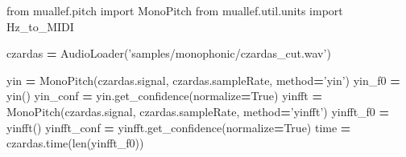 \documentclass[american,]{article}
\newenvironment{Shaded}{\begin{snugshade}}{\end{snugshade}}
\newcommand{\BuiltInTok}[1]{#1}
\newcommand{\ImportTok}[1]{#1}
\newcommand{\NormalTok}[1]{#1}
\newcommand{\OperatorTok}[1]{\textcolor[rgb]{0.81,0.36,0.00}{\textbf{#1}}}
\newcommand{\StringTok}[1]{\textcolor[rgb]{0.31,0.60,0.02}{#1}}
\newcommand{\VariableTok}[1]{\textcolor[rgb]{0.00,0.00,0.00}{#1}}
\begin{document}
\begin{Shaded}
\begin{Highlighting}[]
\ImportTok{from}\NormalTok{ muallef.pitch }\ImportTok{import}\NormalTok{ MonoPitch}
\ImportTok{from}\NormalTok{ muallef.util.units }\ImportTok{import}\NormalTok{ Hz_to_MIDI}

\NormalTok{czardas }\OperatorTok{=}\NormalTok{ AudioLoader(}\StringTok{'samples/monophonic/czardas_cut.wav'}\NormalTok{)}

\NormalTok{yin }\OperatorTok{=}\NormalTok{ MonoPitch(czardas.signal, czardas.sampleRate, method}\OperatorTok{=}\StringTok{'yin'}\NormalTok{)}
\NormalTok{yin_f0 }\OperatorTok{=}\NormalTok{ yin()}
\NormalTok{yin_conf }\OperatorTok{=}\NormalTok{ yin.get_confidence(normalize}\OperatorTok{=}\VariableTok{True}\NormalTok{)}
\NormalTok{yinfft }\OperatorTok{=}\NormalTok{ MonoPitch(czardas.signal, czardas.sampleRate, method}\OperatorTok{=}\StringTok{'yinfft'}\NormalTok{)}
\NormalTok{yinfft_f0 }\OperatorTok{=}\NormalTok{ yinfft()}
\NormalTok{yinfft_conf }\OperatorTok{=}\NormalTok{ yinfft.get_confidence(normalize}\OperatorTok{=}\VariableTok{True}\NormalTok{)}
\NormalTok{time }\OperatorTok{=}\NormalTok{ czardas.time(}\BuiltInTok{len}\NormalTok{(yinfft_f0))}


\end{Highlighting}
\end{Shaded}
\end{document}
